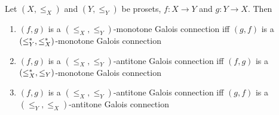 \documentclass{book}
\begin{document}
	\begin{ex} 
		Let $(X, \leq_X)$ and $(Y, \leq_Y)$ be prosets, $f: X \rightarrow Y$ and $g:Y \rightarrow X$. Then 
		\begin{enumerate}
			\item $(f,g)$ is a $(\leq_X, \leq_Y)$-monotone Galois connection iff $(g, f)$ is a $(\leq^*_Y, \leq^*_X)$-monotone Galois connection
			\item $(f,g)$ is a $(\leq_X, \leq_Y)$-antitone Galois connection iff $(f, g)$ is a $(\leq^*_X, \leq_Y)$-monotone Galois connection
			\item $(f,g)$ is a $(\leq_X, \leq_Y)$-antitone Galois connection iff $(g, f)$ is a $(\leq_Y, \leq_X)$-antitone Galois connection
		\end{enumerate}
	\end{ex}
	
\end{document}
